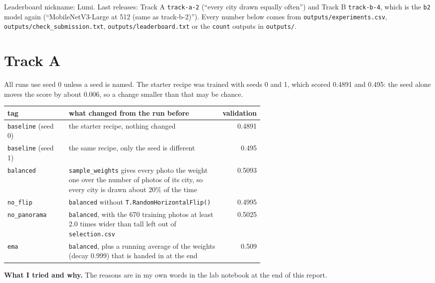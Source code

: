 \documentclass[11pt]{article}
\begin{document}
\makeheader

Leaderboard nickname: Lumi. Last releases: Track A \texttt{track-a-2}
(``every city drawn equally often'') and Track B \texttt{track-b-4}, which is
the \texttt{b2} model again (``MobileNetV3-Large at 512 (same as
track-b-2)''). Every number below comes from
\texttt{outputs/experiments.csv}, \texttt{outputs/check\_submission.txt},
\texttt{outputs/leaderboard.txt} or the \texttt{count} outputs in
\texttt{outputs/}.

\section*{Track A}

All runs use seed 0 unless a seed is named. The starter recipe was trained
with seeds 0 and 1, which scored 0.4891 and 0.495: the seed alone moves the
score by about 0.006, so a change smaller than that may be chance.

\begin{center}\footnotesize
\begin{tabular}{lp{0.6\linewidth}r}
\toprule
tag & what changed from the run before & validation \\
\midrule
\texttt{baseline} (seed 0) & the starter recipe, nothing changed & 0.4891 \\
\texttt{baseline} (seed 1) & the same recipe, only the seed is different & 0.495 \\
\texttt{balanced} & \texttt{sample\_weights} gives every photo the weight one over the number of photos of its city, so every city is drawn about 20\% of the time & 0.5093 \\
\texttt{no\_flip} & \texttt{balanced} without \texttt{T.RandomHorizontalFlip()} & 0.4995 \\
\texttt{no\_panorama} & \texttt{balanced}, with the 670 training photos at least 2.0 times wider than tall left out of \texttt{selection.csv} & 0.5025 \\
\texttt{ema} & \texttt{balanced}, plus a running average of the weights (decay 0.999) that is handed in at the end & 0.509 \\
\bottomrule
\end{tabular}
\end{center}

\textbf{What I tried and why.} The reasons are in my own words in the lab
notebook at the end of this report.
\end{document}
